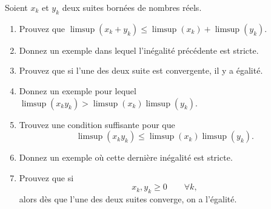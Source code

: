 
\begin{exercice}\label{exo0019}


Soient $x_k$ et $y_k$ deux suites bornées de nombres réels.
\begin{enumerate}
\item
Prouvez que $\limsup(x_k+y_k) \leq \limsup(x_k) + \limsup(y_k)$.
\item
Donnez un exemple dans lequel l'inégalité précédente est stricte.
\item
Prouvez que si l'une des deux suite est convergente, il y a égalité.
\item
Donnez un exemple pour lequel $\limsup(x_k y_k) >  \limsup(x_k)\limsup(y_k)$.
\item
Trouvez une condition suffisante pour que 
\begin{equation}		\label{EqLimSupxyLeqLSxLSy}
	\limsup(x_k y_k) \leq\limsup(x_k)  \limsup(y_k).
\end{equation}

\item
Donnez un exemple où cette dernière inégalité est stricte.
\item
Prouvez que si
\[
	x_k, y_k \geq 0 \qquad \forall k,
\]
alors dès que l'une des deux suites converge, on a l'égalité.
\end{enumerate}

\end{exercice}


